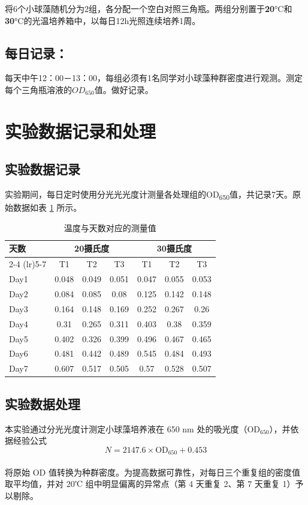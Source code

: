 \documentclass[10.5pt]{config}
\begin{document}
将6个小球藻随机分为2组，各分配一个空白对照三角瓶。两组分别置于\textbf{20}°C和\textbf{30}°C的光温培养箱中，以每日12h光照连续培养1周。

\subsection{每日记录：}

每天中午12：00－13：00，每组必须有1名同学对小球藻种群密度进行观测。测定每个三角瓶溶液的$OD_{650}$值。做好记录。


\section{实验数据记录和处理}

\subsection{实验数据记录}
实验期间，每日定时使用分光光光度计测量各处理组的OD\textsubscript{650}值，共记录7天。原始数据如表 \ref{tab:temperature_data} 所示。

\begin{table}[htbp]
\centering
\caption{温度与天数对应的测量值}
\label{tab:temperature_data}
\begin{tabular}{l *{6}{c}}
\toprule
\multirow{2}{*}{天数} & \multicolumn{3}{c}{20摄氏度} & \multicolumn{3}{c}{30摄氏度} \\
\cmidrule(lr){2-4} \cmidrule(lr){5-7}
& T1 & T2 & T3 & T1 & T2 & T3 \\
\midrule
Day1 & 0.048 & 0.049 & 0.051 & 0.047 & 0.055 & 0.053 \\
Day2 & 0.084 & 0.085 & 0.08  & 0.125 & 0.142 & 0.148 \\
Day3 & 0.164 & 0.148 & 0.169 & 0.252 & 0.267 & 0.26  \\
Day4 & 0.31  & 0.265 & 0.311 & 0.403 & 0.38  & 0.359 \\
Day5 & 0.402 & 0.326 & 0.399 & 0.496 & 0.467 & 0.465 \\
Day6 & 0.481 & 0.442 & 0.489 & 0.545 & 0.484 & 0.493 \\
Day7 & 0.607 & 0.517 & 0.505 & 0.57  & 0.528 & 0.507 \\
\bottomrule
\end{tabular}
\end{table}

\subsection{实验数据处理}
本实验通过分光光度计测定小球藻培养液在 650 nm 处的吸光度（OD$_{650}$），并依据经验公式
\begin{equation}
    N = 2147.6 \times \text{OD}_{650} + 0.453
\end{equation}\\
将原始 OD 值转换为种群密度。为提高数据可靠性，对每日三个重复组的密度值取平均值，并对 20℃ 组中明显偏离的异常点（第 4 天重复 2、第 7 天重复 1）予以剔除。
\end{document}
